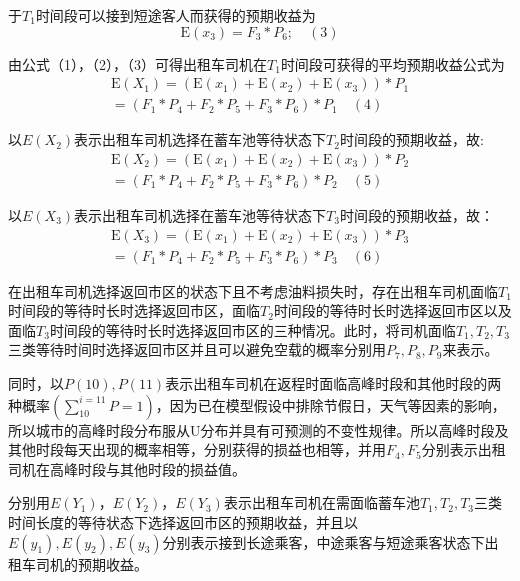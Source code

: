 \documentclass[withoutpreface,bwprint]{cumcmthesis} %
\begin{document}
于$T_1$时间段可以接到短途客人而获得的预期收益为
$$
\mathrm{E}\left(x_{3}\right)=F_{3} * P_{6}; \quad(3)
$$

由公式（1），（2），（3）可得出租车司机在$T_1$时间段可获得的平均预期收益公式为
$$
\begin{array}{l}{\mathrm{E}\left(X_{1}\right)=\left(\mathrm{E}\left(x_{1}\right)+\mathrm{E}\left(x_{2}\right)+\mathrm{E}\left(x_{3}\right)\right) * P_{1}} \\ {=\left(F_{1} * P_{4}+F_{2} * P_{5}+F_{3} * P_{6}\right) * P_{1}} \quad(4)\end{array}
$$

以$E(X_2)$表示出租车司机选择在蓄车池等待状态下$T_2$时间段的预期收益，故:
$$
\begin{array}{l}{\mathrm{E}\left(X_{2}\right)=\left(\mathrm{E}\left(x_{1}\right)+\mathrm{E}\left(x_{2}\right)+\mathrm{E}\left(x_{3}\right)\right) * P_{2}} \\ {=\left(F_{1} * P_{4}+F_{2} * P_{5}+F_{3} * P_{6}\right) * P_{2}} \quad(5)\end{array}
$$

以$E(X_3)$表示出租车司机选择在蓄车池等待状态下$T_3$时间段的预期收益，故：
$$
\begin{array}{l}{\mathrm{E}\left(X_{3}\right)=\left(\mathrm{E}\left(x_{1}\right)+\mathrm{E}\left(x_{2}\right)+\mathrm{E}\left(x_{3}\right)\right) * P_{3} } \\ {=\left(F_{1} * P_{4}+F_{2} * P_{5}+F_{3} * P_{6}\right) * P_{3}} \quad(6)\end{array}
$$

在出租车司机选择返回市区的状态下且不考虑油料损失时，存在出租车司机面临$T_1$时间段的等待时长时选择返回市区，面临$T_2$时间段的等待时长时选择返回市区以及面临$T_3$时间段的等待时长时选择返回市区的三种情况。此时，将司机面临$T_1,T_2,T_3$三类等待时间时选择返回市区并且可以避免空载的概率分别用$P_7,P_8,P_9$来表示。

同时，以$P(10),P(11)$表示出租车司机在返程时面临高峰时段和其他时段的两种概率$\left(\sum_{10}^{i=11} P=1\right)$，因为已在模型假设中排除节假日，天气等因素的影响，所以城市的高峰时段分布服从U分布并具有可预测的不变性规律。所以高峰时段及其他时段每天出现的概率相等，分别获得的损益也相等，并用$F_4,F_5$分别表示出租司机在高峰时段与其他时段的损益值。

分别用$E(Y_1)$，$E(Y_2)$，$E(Y_3)$表示出租车司机在需面临蓄车池$T_1,T_2,T_3$三类时间长度的等待状态下选择返回市区的预期收益，并且以$E(y_1), E(y_2), E(y_3)$分别表示接到长途乘客，中途乘客与短途乘客状态下出租车司机的预期收益。
\end{document}
